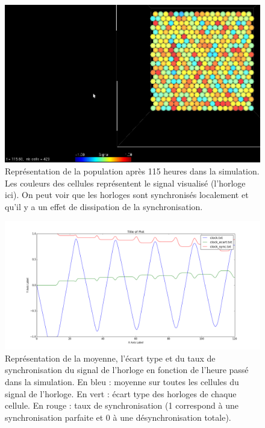 \documentclass[11pt, a4paper]{article}
\begin{document}
\begin{figure}[position]
    \begin{center}
        \includegraphics[scale=0.3]{result_clock_sync_loc}
        \caption{
            \label{result_clock_sync_loc}
            Représentation de la population après 115 heures dans la
            simulation. Les couleurs des cellules représentent le signal
            visualisé (l'horloge ici). On peut voir que les horloges sont
            synchronisés localement et qu'il y a un effet de dissipation de la
            synchronisation.
        }
    \end{center}
\end{figure}

\begin{figure}[position]
    \begin{center}
        \includegraphics[scale=0.35]{result_clock_sync}
        \caption{
            \label{result_clock_sync}
            Représentation de la moyenne, l'écart type et du taux de
            synchronisation du signal de l'horloge en fonction de l'heure passé
            dans la simulation. En bleu : moyenne sur toutes les cellules du
            signal de l'horloge. En vert : écart type des horloges de chaque
            cellule. En rouge : taux de synchronisation (1 correspond à une
            synchronisation parfaite et 0 à une désynchronisation totale).
        }
    \end{center}
\end{figure}
\end{document}
